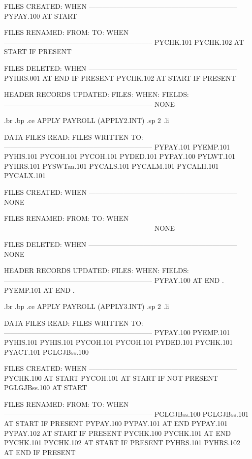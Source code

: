 FILES CREATED:			  WHEN
-----------------------------------------------------------------
       PYPAY.100	      AT START


FILES RENAMED:
  FROM:        TO:		  WHEN
-----------------------------------------------------------------
 PYCHK.101  PYCHK.102	      AT START IF PRESENT


FILES DELETED:			  WHEN
-----------------------------------------------------------------
       PYHRS.001	      AT END IF PRESENT
       PYCHK.102	      AT START IF PRESENT


HEADER RECORDS UPDATED:
FILES:		 WHEN:		    FIELDS:
-----------------------------------------------------------------
       NONE

.br
.bp
.ce
APPLY PAYROLL  (APPLY2.INT)
.sp 2
.li

DATA FILES READ:		   FILES WRITTEN TO:
-----------------------------------------------------------------
       PYPAY.101
       PYEMP.101
       PYHIS.101
       PYCOH.101			PYCOH.101
       PYDED.101
					PYPAY.100
       PYLWT.101
       PYHRS.101
       PYSWTaa.101
       PYCALS.101
       PYCALM.101
       PYCALH.101
       PYCALX.101


FILES CREATED:			  WHEN
-----------------------------------------------------------------
       NONE


FILES RENAMED:
  FROM:        TO:		  WHEN
-----------------------------------------------------------------
       NONE


FILES DELETED:			  WHEN
-----------------------------------------------------------------
       NONE


HEADER RECORDS UPDATED:
FILES:		 WHEN:		    FIELDS:
-----------------------------------------------------------------
 PYPAY.100	AT END		   .
 PYEMP.101	AT END		   .

.br
.bp
.ce
APPLY PAYROLL  (APPLY3.INT)
.sp 2
.li

DATA FILES READ:		   FILES WRITTEN TO:
-----------------------------------------------------------------
       PYPAY.100
       PYEMP.101
       PYHIS.101			PYHIS.101
       PYCOH.101			PYCOH.101
       PYDED.101
					PYCHK.101
       PYACT.101
					PGLGJBss.100

FILES CREATED:			  WHEN
-----------------------------------------------------------------
       PYCHK.100	      AT START
       PYCOH.101	      AT START IF NOT PRESENT
       PGLGJBss.100	      AT START


FILES RENAMED:
  FROM:        TO:		  WHEN
-----------------------------------------------------------------
 PGLGJBss.100 PGLGJBss.101    AT START IF PRESENT
 PYPAY.100  PYPAY.101	      AT END
 PYPAY.101  PYPAY.102	      AT START IF PRESENT
 PYCHK.100  PYCHK.101	      AT END
 PYCHK.101  PYCHK.102	      AT START IF PRESENT
 PYHRS.101  PYHRS.102	      AT END IF PRESENT


